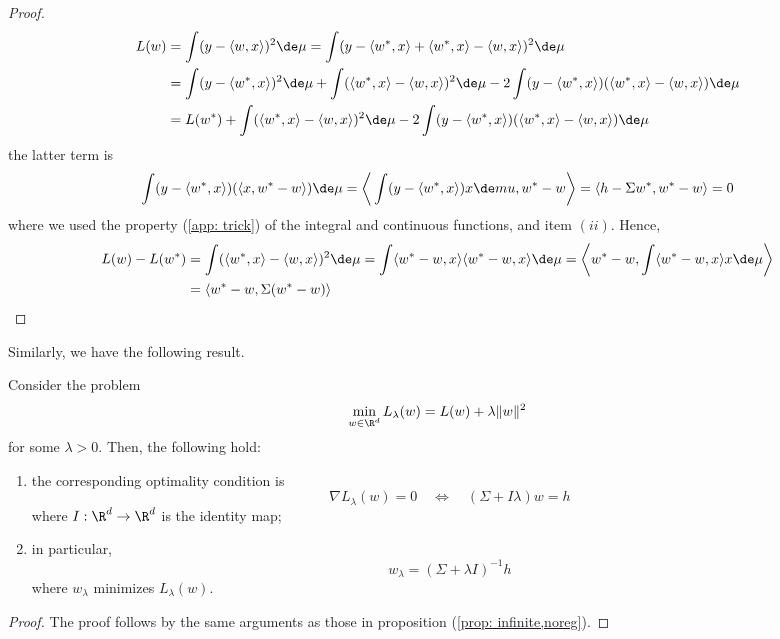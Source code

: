 \begin{proposition}
\begin{proof}
        \begin{align*}
            L(w) &= \int (y-\langle w,x\rangle) ^ 2\de \mu = \int (y - \langle w^*,x\rangle + \langle w^*,x \rangle - \langle w,x\rangle)^2 \de \mu\\
            &= \int (y-\langle w^*,x\rangle)^2 \de \mu + \int (\langle w^*,x\rangle-\langle w,x\rangle)^2 \de \mu - 2\int (y - \langle w^*,x\rangle)(\langle w^*,x\rangle-\langle w,x\rangle) \de \mu \\
            & = L(w^*) + \int (\langle w^*,x\rangle-\langle w,x\rangle)^2 \de \mu - 2\int (y - \langle w^*,x\rangle)(\langle w^*,x\rangle-\langle w,x\rangle) \de \mu
        \end{align*}
        the latter term is
        \begin{align*}
            \int (y-\langle w^*,x\rangle) (\langle x,w^*-w\rangle) \de \mu = \bigg\langle \int (y-\langle w^*,x\rangle)x\de mu, w^*-w\bigg\rangle = \langle h-\Sigma w^*, w^*-w\rangle = 0
        \end{align*}
        where we used the property (\ref{app: trick}) of the integral and continuous functions, and item $(ii)$. Hence,
        \begin{align*}
            L(w) - L(w^*) &= \int (\langle w^*,x\rangle-\langle w,x\rangle)^2 \de \mu  = \int \langle w^*-w,x\rangle\langle w^*-w,x\rangle \de \mu = \bigg\langle w^* - w, \int \langle w^* -w, x\rangle x \de \mu \bigg\rangle \\
            & = \langle w^*-w , \Sigma (w^*-w)\rangle
        \end{align*}
        
    \end{proof}
\end{proposition}

Similarly, we have the following result.
\begin{proposition}\label{prop: infinite,reg}
    Consider the problem 
    \[
    \min_{w\in\R^d} L_\lambda(w) = L(w) + \lambda \Vert w\Vert^2
    \]
    for some $\lambda >0$. Then, the following hold:
    \begin{enumerate}[label=(\roman*)]
        \item the corresponding optimality condition is
        \[\nabla L_\lambda(w) = 0 \quad \Longleftrightarrow \quad (\Sigma + I\lambda)w = h\]
        where $I:\R^d \to \R^d$ is the identity map;
        \item in particular, 
        \[ w_\lambda = (\Sigma + \lambda I)^{-1} h\]
        where $w_\lambda$ minimizes $L_\lambda(w)$.
    \end{enumerate}
    \begin{proof}
        The proof follows by the same arguments as those in proposition (\ref{prop: infinite,noreg}). 
    \end{proof}
\end{proposition}


